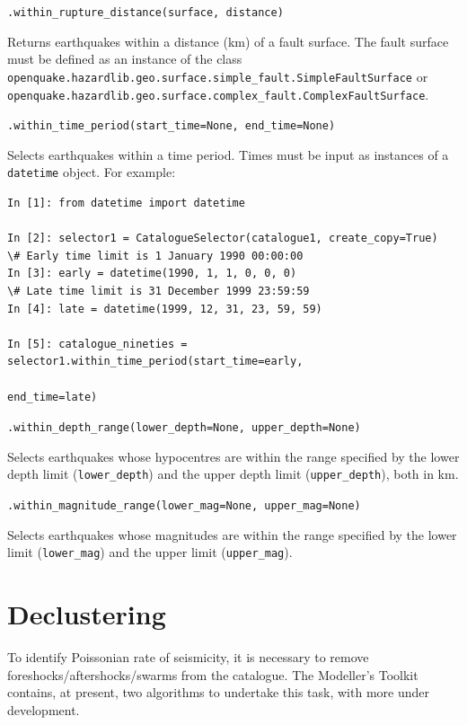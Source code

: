 \verb;.within_rupture_distance(surface, distance);

Returns earthquakes within a distance (km) of a fault surface. The fault surface must be defined as an instance of the class \verb=openquake.hazardlib.geo.surface.simple_fault.SimpleFaultSurface= or\\ \verb=openquake.hazardlib.geo.surface.complex_fault.ComplexFaultSurface=.

\verb;.within_time_period(start_time=None, end_time=None);

Selects earthquakes within a time period. Times must be input as instances of a \verb=datetime= object. For example:

\begin{Verbatim}[frame=single, commandchars=\\\{\}, fontsize=\scriptsize, samepage=true]
In [1]: from datetime import datetime

In [2]: selector1 = CatalogueSelector(catalogue1, create_copy=True)
\# Early time limit is 1 January 1990 00:00:00
In [3]: early = datetime(1990, 1, 1, 0, 0, 0)
\# Late time limit is 31 December 1999 23:59:59
In [4]: late = datetime(1999, 12, 31, 23, 59, 59)

In [5]: catalogue_nineties = selector1.within_time_period(start_time=early,
                                                          end_time=late)
\end{Verbatim}

\verb;.within_depth_range(lower_depth=None, upper_depth=None);

Selects earthquakes whose hypocentres are within the range specified by the lower depth limit (\verb=lower_depth=) and the upper depth limit (\verb=upper_depth=), both in km.

\verb;.within_magnitude_range(lower_mag=None, upper_mag=None);

Selects earthquakes whose magnitudes are within the range specified by the lower limit (\verb=lower_mag=) and the upper limit (\verb=upper_mag=).

\section{Declustering}

To identify Poissonian rate of seismicity, it is necessary to remove foreshocks/aftershocks/swarms from the catalogue. The Modeller's Toolkit contains, at present, two algorithms to undertake this task, with more under development.

